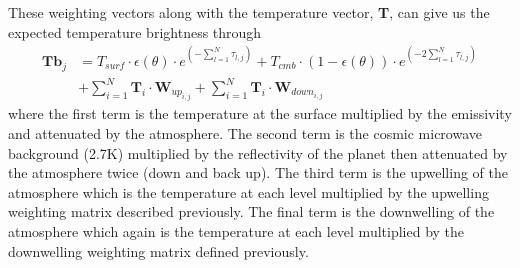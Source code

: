 These weighting vectors along with the temperature vector, \textbf{T}, can give us the expected temperature brightness through
\begin{equation}
\begin{split}
\textbf{Tb}_j 	& = T_{surf}\cdot \epsilon(\theta)\cdot e^{\left(-\sum_{l=1}^{N} \tau_{l,j}\right)} + T_{cmb}\cdot (1-\epsilon(\theta))\cdot e^{\left(-2\sum_{l=1}^{N} \tau_{l,j}\right)} \\
				& + \sum_{i=1}^N \textbf{T}_i \cdot \textbf{W}_{up_{i,j}} + \sum_{i=1}^N \textbf{T}_i \cdot \textbf{W}_{down_{i,j}}
\end{split}
\end{equation}
where the first term is the temperature at the surface multiplied by the emissivity and attenuated by the atmosphere. The second term is the cosmic microwave background (2.7K) multiplied by the reflectivity of the planet then attenuated by the atmosphere twice (down and back up). The third term is the upwelling of the atmosphere which is the temperature at each level multiplied by the upwelling weighting matrix described previously. The final term is the downwelling of the atmosphere which again is the temperature at each level multiplied by the downwelling weighting matrix defined previously. 
